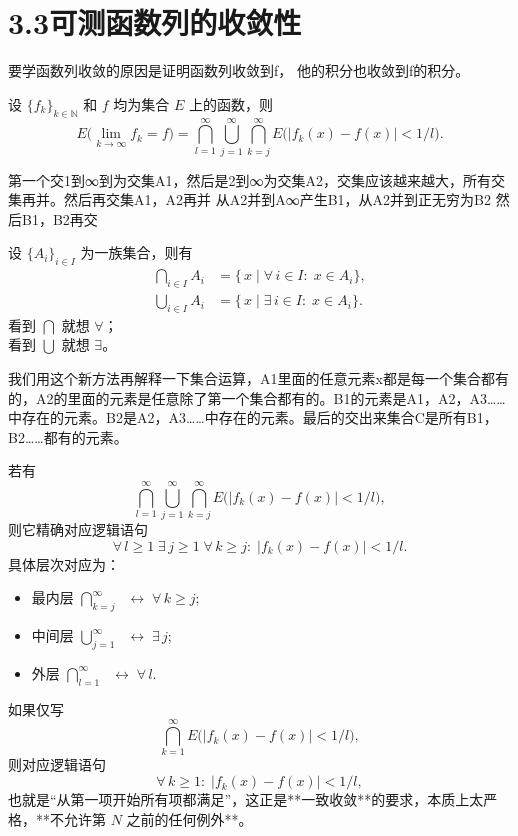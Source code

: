 \documentclass[lang=cn,10pt]{elegantbook}
\begin{document}
\section{3.3可测函数列的收敛性}
要学函数列收敛的原因是证明函数列收敛到f， 他的积分也收敛到f的积分。
\begin{lemma}[收敛点的集合]\label{lem:limit-point-set}
设 $\{f_k\}_{k\in\mathbb{N}}$ 和 $f$ 均为集合 $E$ 上的函数，则
\[
E\bigl(\lim_{k\to\infty}f_k = f\bigr)
=\bigcap_{l=1}^{\infty}
\bigcup_{j=1}^{\infty}
\bigcap_{k=j}^{\infty}
E\bigl(\lvert f_k(x)-f(x)\rvert<1/l\bigr).
\]
\end{lemma}
第一个交1到∞到为交集A1，然后是2到∞为交集A2，交集应该越来越大，所有交集再并。然后再交集A1，A2再并 从A2并到A∞产生B1，从A2并到正无穷为B2 然后B1，B2再交
\begin{proposition}[交并集与量词对应]
设 $\{A_i\}_{i\in I}$ 为一族集合，则有
\begin{align*}
\bigcap_{i\in I}A_i
&=\{\,x\mid \forall\,i\in I:\;x\in A_i\},\\
\bigcup_{i\in I}A_i
&=\{\,x\mid \exists\,i\in I:\;x\in A_i\}.
\end{align*}
看到 $\bigcap$ 就想 $\forall$；\\
看到 $\bigcup$ 就想 $\exists$。
\end{proposition}
我们用这个新方法再解释一下集合运算，A1里面的任意元素x都是每一个集合都有的，A2的里面的元素是任意除了第一个集合都有的。B1的元素是A1，A2，A3……中存在的元素。B2是A2，A3……中存在的元素。最后的交出来集合C是所有B1，B2……都有的元素。
\begin{proposition}[交并集与量词的对应示例]
若有
\[
\bigcap_{l=1}^{\infty}
\bigcup_{j=1}^{\infty}
\bigcap_{k=j}^{\infty}
E\bigl(\lvert f_k(x)-f(x)\rvert<1/l\bigr),
\]
则它精确对应逻辑语句
\[
\forall\,l\ge1\;\exists\,j\ge1\;\forall\,k\ge j:\;\lvert f_k(x)-f(x)\rvert<1/l.
\]
具体层次对应为：
\begin{itemize}
  \item 最内层\quad 
    $\displaystyle\bigcap_{k=j}^{\infty}\;$
    $\longleftrightarrow\;\forall\,k\ge j$;
  \item 中间层\quad 
    $\displaystyle\bigcup_{j=1}^{\infty}\;$
    $\longleftrightarrow\;\exists\,j$;
  \item 外层\quad 
    $\displaystyle\bigcap_{l=1}^{\infty}\;$
    $\longleftrightarrow\;\forall\,l$.
\end{itemize}
\end{proposition}
如果仅写
\[
\bigcap_{k=1}^{\infty}E\bigl(|f_k(x)-f(x)|<1/l\bigr),
\]
则对应逻辑语句
\[
\forall\,k\ge1:\;|f_k(x)-f(x)|<1/l,
\]
也就是“从第一项开始所有项都满足”，这正是**一致收敛**的要求，本质上太严格，**不允许第 \(N\) 之前的任何例外**。
\end{document}
